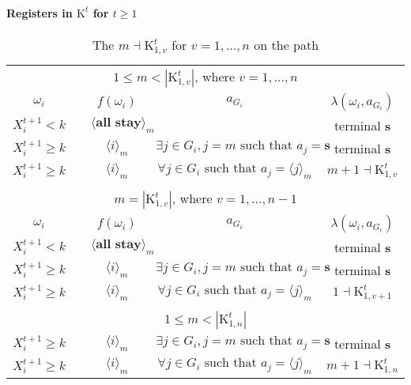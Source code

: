 \documentclass[12pt,letter]{article}
\newcommand{\Kappa}{\mathrm{K}}
\theoremstyle{definition}
\theoremstyle{remark}
\theoremstyle{claim}
\begin{document}
\paragraph{Registers in $\Kappa^t$ for $t\geq 1$}
\clearpage
\begin{table}[!htbp]
\caption{The $m\dashv\Kappa^t_{1,v}$ for $v=1,...,n$ on the path}
\label{table:eqm_path_kt1}
\begin{center}
\begin{tabular}{c c | c | c | c}
\multicolumn{5}{c}{$1\leq m < |\Kappa^t_{1,v}|$, where $v=1,...,n$}\\
$\omega_i$ 	 & 	   &	$f(\omega_i)$  &	$a_{G_i}$ & $\lambda(\omega_i,a_{G_i})$ \\
\hline
\hline
$X^{t+1}_i<k$  	&                                & $\langle \textbf{all stay} \rangle_m$		&				 				& terminal \textbf{s}\\
$X^{t+1}_i\geq k$  	& 						& $\langle i \rangle_m$		&  $\exists j\in G_i, j=m\text{ such that } a_j=\textbf{s}$	& terminal \textbf{s}\\
$X^{t+1}_i\geq k$ 	& 						& $\langle i \rangle_m$		&  $\forall j\in G_i\text{ such that } a_j= \langle j \rangle_m$	& $m+1\dashv \Kappa^t_{1,v}$\\
\hline
\\
\multicolumn{5}{c}{$m= |\Kappa^t_{1,v}|$, where $v=1,...,n-1$}\\
$\omega_i$ 	 & 	   &	$f(\omega_i)$  &	$a_{G_i}$ & $\lambda(\omega_i,a_{G_i})$ \\
\hline
\hline
$X^{t+1}_i<k$  	&                                & $\langle \textbf{all stay} \rangle_m$	&				 				& terminal \textbf{s}\\
$X^{t+1}_i\geq k$ & 						& $\langle i \rangle_m$		&  $\exists j\in G_i, j=m\text{ such that } a_j=\textbf{s}$	& terminal \textbf{s}\\
$X^{t+1}_i\geq k$ 	& 						& $\langle i \rangle_m$		&  $\forall j\in G_i\text{ such that } a_j= \langle j \rangle_m$	& $1\dashv \Kappa^t_{1,v+1}$\\
\hline
\\
\multicolumn{5}{c}{$1\leq m < |\Kappa^t_{1,n}|$}\\
\hline
\hline
$X^{t+1}_i\geq k$ 	& 						& $\langle i \rangle_m$		&  $\exists j\in G_i, j=m\text{ such that } a_j=\textbf{s}$	& terminal \textbf{s}\\
$X^{t+1}_i\geq k$ & 						& $\langle i \rangle_m$		&  $\forall j\in G_i\text{ such that } a_j= \langle j \rangle_m$	& $m+1\dashv \Kappa^t_{1,n}$\\

\end{tabular}
\end{center}
\end{table}
\end{document}
